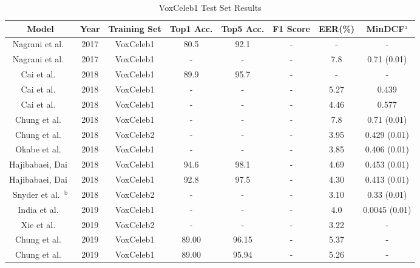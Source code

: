 \documentclass[conference]{IEEEtran}
\begin{document}
\begin{table}[htbp]
    \caption{VoxCeleb1 Test Set Results}
    \begin{center}
        \begin{tabular}{|c|c|c|c|c|c|c|c|}
        \hline
        \textbf{Model} & \textbf{Year} & \textbf{Training Set} &  \textbf{Top1 Acc.} & \textbf{Top5 Acc.} & \textbf{F1 Score} & \textbf{EER(\%)} & \textbf{MinDCF}$^{\mathrm{a}}$\\
        \hline
        Nagrani et al.~\cite{nagrani2017voxceleb} & 2017 & VoxCeleb1 & 80.5 & 92.1 & - & - & - \\
        Nagrani et al.~\cite{nagrani2017voxceleb} & 2017 & VoxCeleb1 & - & - & - & 7.8 & 0.71 (0.01) \\
        Cai et al.~\cite{cai2018exploring} & 2018 & VoxCeleb1 & 89.9 & 95.7 & - & - & - \\
        Cai et al.~\cite{cai2018exploring} & 2018 & VoxCeleb1 & - & - & - & 5.27 & 0.439 \\
        Cai et al.~\cite{cai2018exploring} & 2018 & VoxCeleb1 & - & - & - & 4.46 & 0.577 \\
        Chung et al.~\cite{chung2018voxceleb2} & 2018 & VoxCeleb1 & - & - & - & 7.8 & 0.71 (0.01) \\
        Chung et al.~\cite{chung2018voxceleb2} & 2018 & VoxCeleb2 & - & - & - & 3.95 & 0.429 (0.01) \\
        Okabe et al.~\cite{okabe2018asp} & 2018 & VoxCeleb1 & - & - & - & 3.85 & 0.406 (0.01) \\
        Hajibabaei, Dai~\cite{hajibabaei2018unified} & 2018 & VoxCeleb1 & 94.6 & 98.1 & - & 4.69 & 0.453 (0.01) \\
        Hajibabaei, Dai~\cite{hajibabaei2018unified} & 2018 & VoxCeleb1 & 92.8 & 97.5 & - & 4.30 & 0.413 (0.01) \\
        Snyder et al.~\cite{snyder2018xvectors}$^{\mathrm{b}}$ & 2018 & VoxCeleb2 & - & - & - & 3.10 & 0.33 (0.01) \\
        India et al.~\cite{india2019selfmha} & 2019 & VoxCeleb1 & - & - & - & 4.0 & 0.0045 (0.01) \\
        Xie et al.~\cite{xie2019utterance} & 2019 & VoxCeleb2 & - & - & - & 3.22 & - \\
        Chung et al.~\cite{chung2019delving} & 2019 & VoxCeleb1 & 89.00 & 96.15 & - & 5.37 & - \\
        Chung et al.~\cite{chung2019delving} & 2019 & VoxCeleb1 & 89.00 & 95.94 & - & 5.26 & - \\

\end{tabular}
\end{center}
\end{table}
\end{document}
